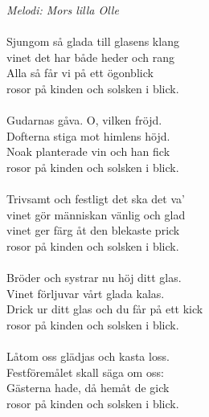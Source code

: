 {\footnotesize\textit{Melodi: Mors lilla Olle}}\\
\\
Sjungom så glada till glasens klang\\
vinet det har både heder och rang\\
Alla så får vi på ett ögonblick\\
rosor på kinden och solsken i blick.\\
\\
Gudarnas gåva. O, vilken fröjd.\\
Dofterna stiga mot himlens höjd.\\
Noak planterade vin och han fick\\
rosor på kinden och solsken i blick.\\
\\
Trivsamt och festligt det ska det va'\\
vinet gör människan vänlig och glad\\
vinet ger färg åt den blekaste prick\\
rosor på kinden och solsken i blick.\\
\\
Bröder och systrar nu höj ditt glas.\\
Vinet förljuvar vårt glada kalas.\\
Drick ur ditt glas och du får på ett kick\\
rosor på kinden och solsken i blick.\\
\\
Låtom oss glädjas och kasta loss.\\
Festföremålet skall säga om oss:\\
Gästerna hade, då hemåt de gick\\
rosor på kinden och solsken i blick.
